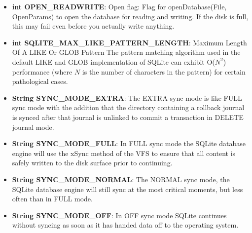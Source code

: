 \documentclass{report}
\begin{document}
\begin{itemize}
\begin{itemize}
\begin{itemize}
                \item \textbf{int	OPEN\_READWRITE}: Open flag: Flag for openDatabase(File, OpenParams) to open the database for reading and writing. If the disk is full, this may fail even before you actually write anything.
                \item \textbf{int	SQLITE\_MAX\_LIKE\_PATTERN\_LENGTH}: Maximum Length Of A LIKE Or GLOB Pattern The pattern matching algorithm used in the default LIKE and GLOB implementation of SQLite can exhibit O($N^{2}$) performance (where $N$ is the number of characters in the pattern) for certain pathological cases.
                \item \textbf{String	SYNC\_MODE\_EXTRA}: The EXTRA sync mode is like FULL sync mode with the addition that the directory containing a rollback journal is synced after that journal is unlinked to commit a transaction in DELETE journal mode.
                \item \textbf{String	SYNC\_MODE\_FULL}: In FULL sync mode the SQLite database engine will use the xSync method of the VFS to ensure that all content is safely written to the disk surface prior to continuing.
                \item \textbf{String	SYNC\_MODE\_NORMAL}: The NORMAL sync mode, the SQLite database engine will still sync at the most critical moments, but less often than in FULL mode.
                \item \textbf{String	SYNC\_MODE\_OFF}: In OFF sync mode SQLite continues without syncing as soon as it has handed data off to the operating system.
            \end{itemize}
    \end{itemize}

    \pagebreak 

\end{itemize}
\end{document}
